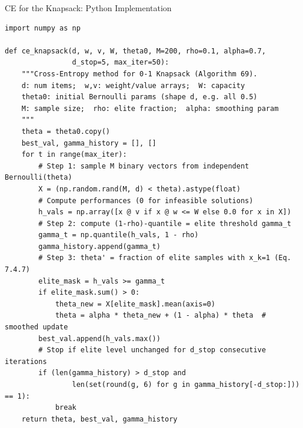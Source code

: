\documentclass[aspectratio=169,10pt]{beamer}
\begin{document}
\begin{frame}[fragile]{CE for the Knapsack: Python Implementation}
  \begin{lstlisting}[style=python,basicstyle=\ttfamily\tiny]
import numpy as np

def ce_knapsack(d, w, v, W, theta0, M=200, rho=0.1, alpha=0.7,
                d_stop=5, max_iter=50):
    """Cross-Entropy method for 0-1 Knapsack (Algorithm 69).
    d: num items;  w,v: weight/value arrays;  W: capacity
    theta0: initial Bernoulli params (shape d, e.g. all 0.5)
    M: sample size;  rho: elite fraction;  alpha: smoothing param
    """
    theta = theta0.copy()
    best_val, gamma_history = [], []
    for t in range(max_iter):
        # Step 1: sample M binary vectors from independent Bernoulli(theta)
        X = (np.random.rand(M, d) < theta).astype(float)
        # Compute performances (0 for infeasible solutions)
        h_vals = np.array([x @ v if x @ w <= W else 0.0 for x in X])
        # Step 2: compute (1-rho)-quantile = elite threshold gamma_t
        gamma_t = np.quantile(h_vals, 1 - rho)
        gamma_history.append(gamma_t)
        # Step 3: theta' = fraction of elite samples with x_k=1 (Eq. 7.4.7)
        elite_mask = h_vals >= gamma_t
        if elite_mask.sum() > 0:
            theta_new = X[elite_mask].mean(axis=0)
            theta = alpha * theta_new + (1 - alpha) * theta  # smoothed update
        best_val.append(h_vals.max())
        # Stop if elite level unchanged for d_stop consecutive iterations
        if (len(gamma_history) > d_stop and
                len(set(round(g, 6) for g in gamma_history[-d_stop:])) == 1):
            break
    return theta, best_val, gamma_history
  \end{lstlisting}
\end{frame}
\end{document}
